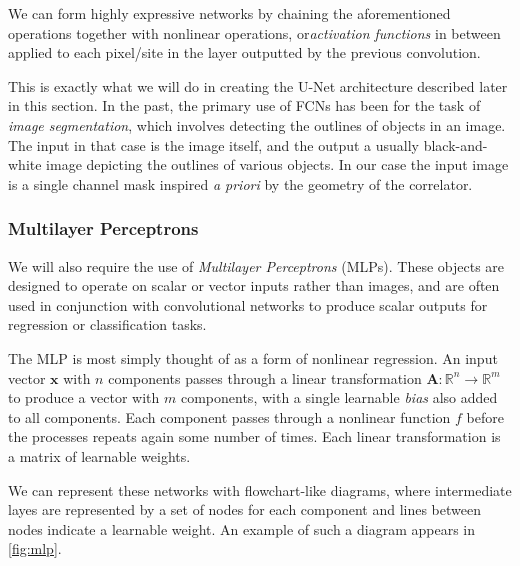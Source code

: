 \documentclass[12pt]{article}
\begin{document}
We can form highly expressive networks by chaining the aforementioned operations together with nonlinear operations, or\textit{activation functions} in between applied
to each pixel/site in the layer outputted by the previous convolution.

This is exactly what we will do in creating the U-Net architecture described later in this section. In the past, the primary use of FCNs has been for the task 
of \textit{image segmentation}, which involves detecting the outlines of objects in an image. The input in that case is the image itself, and the output
a usually black-and-white image depicting the outlines of various objects. In our case the input image is a single channel mask inspired \textit{a priori}
by the geometry of the correlator.

\subsubsection{Multilayer Perceptrons}

We will also require the use of \textit{Multilayer Perceptrons} (MLPs). These objects are designed to operate on scalar or vector inputs
rather than images, and are often used in conjunction with convolutional networks to produce scalar outputs for regression or classification tasks.

The MLP is most simply thought of as a form of nonlinear regression. An input vector $\mathbf{x}$ with $n$ components passes through a linear
transformation $\mathbf{A}:\mathbb{R}^n\to \mathbb{R}^m$ to produce a vector with $m$ components, with a single learnable \textit{bias} also added to all components. Each component passes through a nonlinear function $f$ 
before the processes repeats again some number of times. Each linear transformation is a matrix of learnable weights. 

We can represent these networks with flowchart-like diagrams, where intermediate layes are represented by a set of nodes for each component and lines between nodes
indicate a learnable weight. An example of such a diagram appears in \ref{fig:mlp}.
\end{document}
